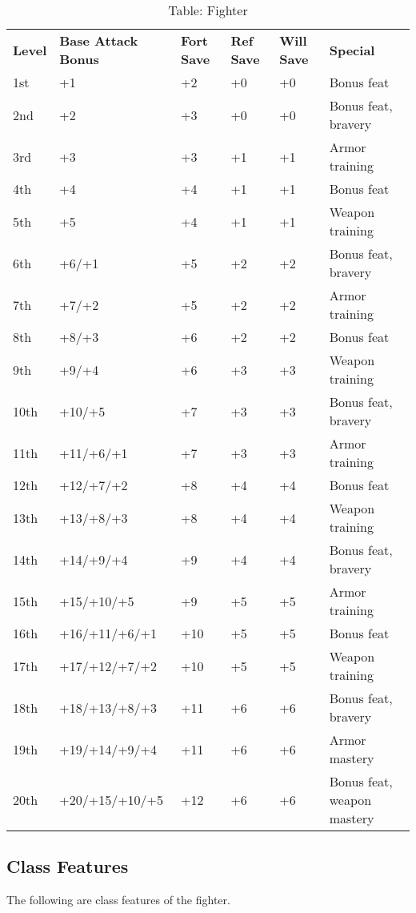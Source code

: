 \begin{table}[]
\sffamily
\setlength{\tabcolsep}{1pt}
\caption{Table: Fighter}
\begin{tabular}{llllll}
\textbf{Level} & \textbf{Base Attack Bonus} & \textbf{Fort Save} & \textbf{Ref Save} & \textbf{Will Save} & \textbf{Special}\\
1st & +1 & +2 & +0 & +0 & Bonus feat\\
2nd & +2 & +3 & +0 & +0 & Bonus feat, bravery\\
3rd & +3 & +3 & +1 & +1 & Armor training\\
4th & +4 & +4 & +1 & +1 & Bonus feat\\
5th & +5 & +4 & +1 & +1 & Weapon training\\
6th & +6/+1 & +5 & +2 & +2 & Bonus feat, bravery\\
7th & +7/+2 & +5 & +2 & +2 & Armor training\\
8th & +8/+3 & +6 & +2 & +2 & Bonus feat\\
9th & +9/+4 & +6 & +3 & +3 & Weapon training\\
10th & +10/+5 & +7 & +3 & +3 & Bonus feat, bravery\\
11th & +11/+6/+1 & +7 & +3 & +3 & Armor training\\
12th & +12/+7/+2 & +8 & +4 & +4 & Bonus feat\\
13th & +13/+8/+3 & +8 & +4 & +4 & Weapon training\\
14th & +14/+9/+4 & +9 & +4 & +4 & Bonus feat, bravery\\
15th & +15/+10/+5 & +9 & +5 & +5 & Armor training\\
16th & +16/+11/+6/+1 & +10 & +5 & +5 & Bonus feat\\
17th & +17/+12/+7/+2 & +10 & +5 & +5 & Weapon training\\
18th & +18/+13/+8/+3 & +11 & +6 & +6 & Bonus feat, bravery\\
19th & +19/+14/+9/+4 & +11 & +6 & +6 & Armor mastery\\
20th & +20/+15/+10/+5 & +12 & +6 & +6 & Bonus feat, weapon mastery\\
\end{tabular}
\end{table}
				
\subsection{Class Features}

				
The following are class features of the fighter.
				
